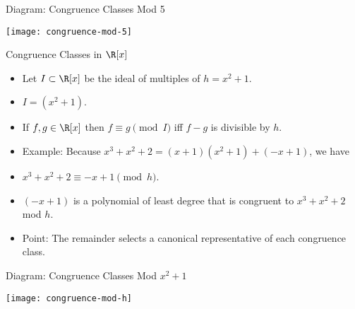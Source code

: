 \documentclass{beamer}
\begin{document}

\begin{frame}{Diagram: Congruence Classes Mod 5}

\begin{center}
\texttt{[image: congruence-mod-5]}
\end{center}

\end{frame}



\begin{frame}{Congruence Classes in $\R[x]$}

\begin{itemize}
  \item Let $I \subset \R[x]$ be the ideal of multiples of $h = x^2+1$.
  \item $I = (x^2+1)$.
  \item If $f,g\in\R[x]$ then $f\equiv g \pmod I$ iff $f-g$ is divisible by $h$.
  \item Example: Because $x^3 + x^2 + 2 = (x+1)(x^2+1) + ( -x + 1)$, we have
  \item $x^3 + x^2 + 2 \equiv -x +1 \pmod {h}$.
  \item $(-x+1)$ is a polynomial of least degree that is congruent to $x^3 + x^2 + 2$ mod $h$.
  \item Point: The remainder selects a canonical representative of each congruence class.
\end{itemize}
\end{frame}

\begin{frame}{Diagram: Congruence Classes Mod $x^2 + 1$}

\begin{center}
\texttt{[image: congruence-mod-h]}
\end{center}

\end{frame}


\end{document}
